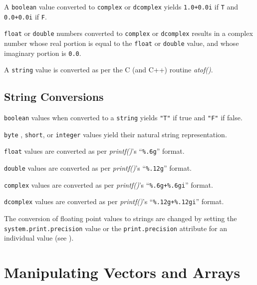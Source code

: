 A {\tt boolean} value converted to {\tt complex} or {\tt dcomplex} yields
{\tt 1.0+0.0i} if {\tt T} and {\tt 0.0+0.0i} if {\tt F}.

{\tt float} or {\tt double} numbers converted to {\tt complex} or
{\tt dcomplex} results in a complex number whose real portion is
equal to the {\tt float} or {\tt double} value, and whose imaginary
portion is {\tt 0.0}.

A {\tt string} value is converted as per the C (and C++)
routine {\em atof()}.

\subsection{String Conversions}

\begin{sloppy}
\begin{list}{}{}

\item[{\tt boolean}] values when converted to a {\tt string} yields {\tt "T"}
if true and {\tt "F"} if false.

\item[{\tt byte}], {\tt short}, or {\tt integer} values yield
their natural string representation.

\item[{\tt float}] values are converted as per {\em printf()}'s ``{\tt \%.6g}''
format.

\item[{\tt double}] values are converted as per {\em printf()}'s ``{\tt \%.12g}''
format.

\item[{\tt complex}] values are converted as per {\em printf()}'s ``{\tt \%.6g+\%.6gi}''
format.

\item[{\tt dcomplex}] values are converted as per {\em printf()}'s ``{\tt \%.12g+\%.12gi}''
format.
\end{list}
\end{sloppy}

The conversion of floating point values to strings are changed by setting the
{\tt system.print.precision} value or the {\tt print.precision} attribute for an
individual value (see ).


\section{Manipulating Vectors and Arrays}
\label{predefined-vectors}

